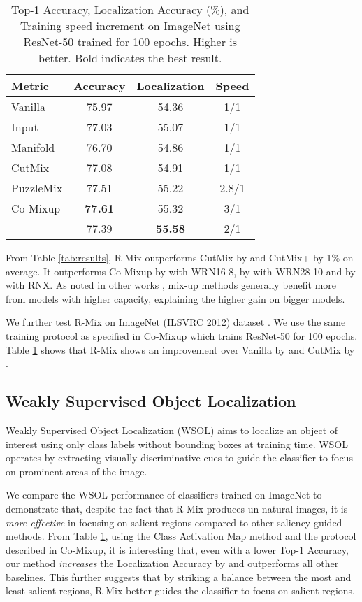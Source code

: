 \documentclass[letterpaper]{article} \usepackage[submission]{aaai23}  \usepackage{times}  \usepackage{helvet}  \usepackage{courier}  \usepackage[hyphens]{url}  \usepackage{graphicx} \urlstyle{rm} \def\UrlFont{\rm}  \usepackage{natbib}  \usepackage{caption} \frenchspacing  \setlength{\pdfpagewidth}{8.5in} \setlength{\pdfpageheight}{11in}
\newcommand{\cutmix}{{CutMix}}
\newcommand{\comixup}{{Co-Mixup}}
\newcommand{\rrlmix}{{R-Mix}}
\newcommand{\imagenet}{ImageNet}
\begin{document}
\begin{table}[t!]
  \centering
  \begin{tabular}{lccc}
  \hline
    Metric & Accuracy  & Localization & Speed\\ \hline
    Vanilla & 75.97  & 54.36 & 1/1\\ 
    Input & 77.03  & 55.07 & 1/1\\
    Manifold & 76.70  & 54.86 & 1/1 \\ 
    CutMix & 77.08  & 54.91 & 1/1 \\ 
    PuzzleMix & 77.51 & 55.22 & 2.8/1 \\ 
    Co-Mixup & \textbf{77.61}  & 55.32 & 3/1 \\ \hline
     & 77.39 & \textbf{55.58} & 2/1 \\ \hline
  \end{tabular}
  \caption{Top-1 Accuracy, Localization Accuracy (\%), and Training speed increment on \imagenet{} using ResNet-50 trained for 100 epochs. Higher is better. Bold indicates the best result.}
  \label{tab:resultsImgNet}
\end{table}


From Table \ref{tab:results}, \rrlmix{} outperforms \cutmix{} by  and \cutmix{}+ by 1\% on average. It outperforms \comixup{} by  with WRN16-8, by  with WRN28-10 and by  with RNX. As noted in other works \cite{zhang2018mixup}, mix-up methods generally benefit more from models with higher capacity, explaining the higher gain on bigger models.



We further test \rrlmix{} on \imagenet{} (ILSVRC 2012) dataset \cite{Russakovski2015ImageNet}. We use the same training protocol as specified in \comixup{} which trains ResNet-50 for 100 epochs. Table \ref{tab:resultsImgNet} shows that \rrlmix{} shows an improvement over Vanilla by  and \cutmix{} by .





\subsection{Weakly Supervised Object Localization}
Weakly Supervised Object Localization (WSOL) aims to localize an object of interest using only class labels without bounding boxes at training time. WSOL operates by extracting visually discriminative cues to guide the classifier to focus on prominent areas of the image.

We compare the WSOL performance of classifiers trained on \imagenet{} to demonstrate that, despite the fact that \rrlmix{} produces un-natural images, it is \emph{more effective} in focusing on salient regions compared to other saliency-guided methods. From Table \ref{tab:resultsImgNet}, using the Class Activation Map method \cite{zhou2015learning} and the protocol described in \comixup{}, it is interesting that, even with a lower Top-1 Accuracy, our method \emph{increases} the Localization Accuracy by  and outperforms all other baselines. This further suggests that by striking a balance between the most and least salient regions, \rrlmix{} better guides the classifier to focus on salient regions.
\end{document}
